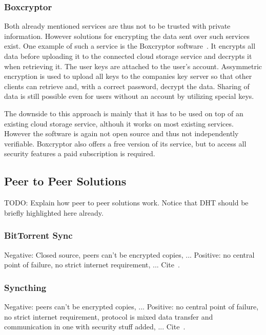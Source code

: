 \subsubsection{Boxcryptor}

Both already mentioned services are thus not to be trusted with private information.
However solutions for encrypting the data sent over such services exist.
One example of such a service is the Boxcryptor software~\cite{web:site:boxcryptor}.
It encrypts all data before uploading it to the connected cloud storage service and decrypts it when retrieving it.
The user keys are attached to the user's account.
Assymmetric encryption is used to upload all keys to the companies key server so that other clients can retrieve and, with a correct password, decrypt the data.
Sharing of data is still possible even for users without an account by utilizing special keys.

The downside to this approach is mainly that it has to be used on top of an existing cloud storage service, althouh it works on most existing services.
However the software is again not open source and thus not independently verifiable.
Boxcryptor also offers a free version of its service, but to access all security features a paid subscription is required.

\subsection{Peer to Peer Solutions}

TODO: Explain how peer to peer solutions work.
Notice that DHT should be briefly highlighted here already.

\subsubsection{BitTorrent Sync}

Negative: Closed source, peers can't be encrypted copies, ...
Positive: no central point of failure, no strict internet requirement, ...
Cite~\cite{web:site:bittorrent_sync}.

\subsubsection{Syncthing}

Negative: peers can't be encrypted copies, ...
Positive: no central point of failure, no strict internet requirement, protocol is mixed data transfer and communication in one with security stuff added, ...
Cite~\cite{web:site:synthing}.

